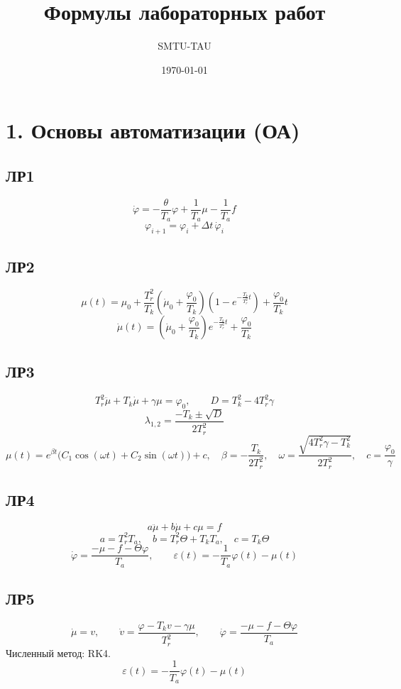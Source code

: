 \documentclass[12pt,a4paper]{article}
\title{Формулы лабораторных работ}
\author{SMTU-TAU}
\date{\today}
\begin{document}
\maketitle

\section*{1. Основы автоматизации (ОА)}

\subsection*{ЛР1}
\[
\dot{\varphi} = -\frac{\theta}{T_a}\varphi + \frac{1}{T_a}\mu - \frac{1}{T_a}f
\]
\[
\varphi_{i+1} = \varphi_i + \Delta t\,\dot{\varphi}_i
\]

\subsection*{ЛР2}
\[
\mu(t)=\mu_0+\frac{T_r^2}{T_k}\left(\dot{\mu}_0+\frac{\varphi_0}{T_k}\right)\left(1-e^{-\frac{T_k}{T_r^2}t}\right)+\frac{\varphi_0}{T_k}t
\]
\[
\dot{\mu}(t)=\left(\dot{\mu}_0+\frac{\varphi_0}{T_k}\right)e^{-\frac{T_k}{T_r^2}t}+\frac{\varphi_0}{T_k}
\]

\subsection*{ЛР3}
\[
T_r^2\ddot{\mu}+T_k\dot{\mu}+\gamma\mu=\varphi_0,\qquad
D=T_k^2-4T_r^2\gamma
\]
\[
\lambda_{1,2}=\frac{-T_k\pm\sqrt{D}}{2T_r^2}
\]
\[
\mu(t)=e^{\beta t}\bigl(C_1\cos(\omega t)+C_2\sin(\omega t)\bigr)+c,
\quad
\beta=-\frac{T_k}{2T_r^2},
\quad
\omega=\frac{\sqrt{4T_r^2\gamma-T_k^2}}{2T_r^2},
\quad
c=\frac{\varphi_0}{\gamma}
\]

\subsection*{ЛР4}
\[
a\ddot{\mu}+b\dot{\mu}+c\mu=f
\]
\[
a=T_r^2T_a,\quad
b=T_r^2\Theta+T_kT_a,\quad
c=T_k\Theta
\]
\[
\dot{\varphi}=\frac{-\mu-f-\Theta\varphi}{T_a},
\qquad
\varepsilon(t)=-\frac{1}{T_a}\varphi(t)-\mu(t)
\]

\subsection*{ЛР5}
\[
\dot{\mu}=v,\qquad
\dot{v}=\frac{\varphi-T_kv-\gamma\mu}{T_r^2},\qquad
\dot{\varphi}=\frac{-\mu-f-\Theta\varphi}{T_a}
\]
Численный метод: RK4.
\[
\varepsilon(t)=-\frac{1}{T_a}\varphi(t)-\mu(t)
\]
\end{document}
